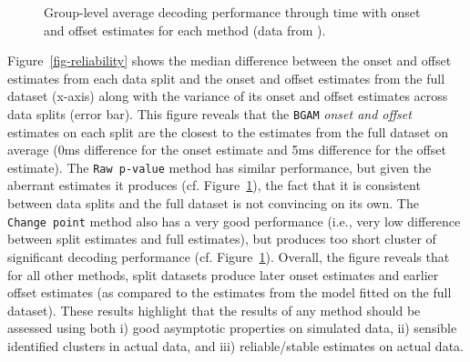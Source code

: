 \documentclass[
  doc,
  floatsintext,
  longtable,
  a4paper,
  nolmodern,
  notxfonts,
  notimes,
  colorlinks=true,linkcolor=blue,citecolor=blue,urlcolor=blue]{apa7}
\begin{document}
\begin{figure}[!htb]

\caption{\label{fig-onset-offset}Group-level average decoding
performance through time with onset and offset estimates for each method
(data from ).}


\end{figure}%

Figure~\ref{fig-reliability} shows the median difference between the
onset and offset estimates from each data split and the onset and offset
estimates from the full dataset (x-axis) along with the variance of its
onset and offset estimates across data splits (error bar). This figure
reveals that the \texttt{BGAM} \emph{onset and offset} estimates on each
split are the closest to the estimates from the full dataset on average
(0ms difference for the onset estimate and 5ms difference for the offset
estimate). The \texttt{Raw\ p-value} method has similar performance, but
given the aberrant estimates it produces (cf.
Figure~\ref{fig-onset-offset}), the fact that it is consistent between
data splits and the full dataset is not convincing on its own. The
\texttt{Change\ point} method also has a very good performance (i.e.,
very low difference between split estimates and full estimates), but
produces too short cluster of significant decoding performance (cf.
Figure~\ref{fig-onset-offset}). Overall, the figure reveals that for all
other methods, split datasets produce later onset estimates and earlier
offset estimates (as compared to the estimates from the model fitted on
the full dataset). These results highlight that the results of any
method should be assessed using both i) good asymptotic properties on
simulated data, ii) sensible identified clusters in actual data, and
iii) reliable/stable estimates on actual data.
\end{document}
